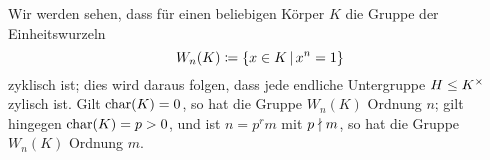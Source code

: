 \begin{remark}
  Wir werden sehen, dass für einen beliebigen Körper $K$ die Gruppe der Einheitswurzeln
  \[
              W_n(K)
    \coloneqq \{x \in K \suchthat x^n = 1\}
  \]
  zyklisch ist;
  dies wird daraus folgen, dass jede endliche Untergruppe $H \leq K^\times$ zylisch ist.
  Gilt $\operatorname{char}(K) = 0$, so hat die Gruppe $W_n(K)$ Ordnung $n$;
  gilt hingegen $\operatorname{char}(K) = p > 0$, und ist $n = p^r m$ mit $p \mathrel{\nmid} m$, so hat die Gruppe $W_n(K)$ Ordnung $m$.
\end{remark}


